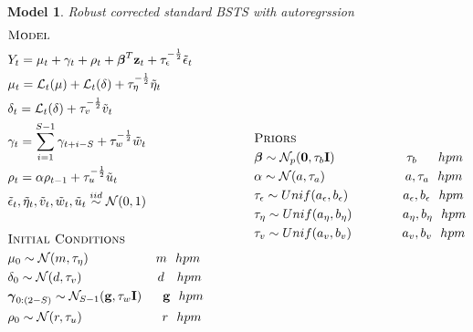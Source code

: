 \documentclass[11pt,twoside]{report}
\newtheorem{model}{Model}
\begin{document}
\begin{model} Robust corrected standard BSTS with autoregrssion
	\begin{equation*}
	\begin{aligned}
	&\textsc{Model}\\
	&Y_t = \mu_t + \gamma_t + \rho_t + \boldsymbol{\beta}^T\mathbf{z}_t + \tau_\epsilon^{-\frac{1}{2}}\tilde{\epsilon}_t\\
	&\mu_t = \mathcal{L}_t(\mu) + \mathcal{L}_t(\delta) +\tau_\eta^{-\frac{1}{2}}\tilde{\eta}_t\\
	&\delta_t = \mathcal{L}_t(\delta) + \tau_v^{-\frac{1}{2}}\tilde{v}_t\\
	&\gamma_t = \sum_{i=1}^{S-1}\gamma_{t+i-S} + \tau_w^{-\frac{1}{2}}\tilde{w}_t\\
	&\rho_t = \alpha\rho_{t-1} + \tau_u^{-\frac{1}{2}}\tilde{u}_t\\
	&\tilde{\epsilon}_t, \tilde{\eta}_t, \tilde{v}_t, \tilde{w}_t, \tilde{u}_t \overset{iid}{\sim} \mathcal{N}(0,1)\\
	\\
	&\textsc{Initial Conditions}\\
	&\mu_0 \sim \mathcal{N}(m, \tau_\eta)\quad \quad \quad \quad \quad\  m\ \ hpm\\
	&\delta_0 \sim \mathcal{N}(d, \tau_v)\quad \quad \quad \quad \quad \quad d\ \ \ hpm\\
	&\boldsymbol{\gamma}_{0:(2-S)} \sim \mathcal{N}_{S-1}(\mathbf{g}, \tau_w\mathbf{I})\quad\ \ \mathbf{g}\ \ hpm\\
	&\rho_0 \sim \mathcal{N}(r, \tau_u)\quad \quad \quad \quad \quad \quad \ r\ \ hpm\\
	\\
	\end{aligned}
	\qquad \qquad
	\begin{aligned}[c]
	&\textsc{Priors}\\
	&\boldsymbol{\beta} \sim \mathcal{N}_p(\mathbf{0}, \tau_b \mathbf{I})\ \ \quad \quad \quad \quad \quad \tau_b\ \quad \ hpm\\
	&\alpha \sim \mathcal{N}(a, \tau_a) \ \quad \quad \quad \quad \quad \quad a, \tau_a\ \ hpm\\
	&\tau_\epsilon \sim Unif(a_\epsilon, b_\epsilon)\quad\quad\ \quad \quad a_\epsilon, b_\epsilon\ \ hpm\\
	&\tau_\eta \sim Unif(a_\eta, b_\eta)\quad\quad\quad \quad a_\eta, b_\eta\ \ hpm\\
	&\tau_v \sim Unif(a_v, b_v)\quad\quad\quad \quad a_v, b_v\ \ hpm\\

\end{aligned}
\end{equation*}
\end{model}
\end{document}
